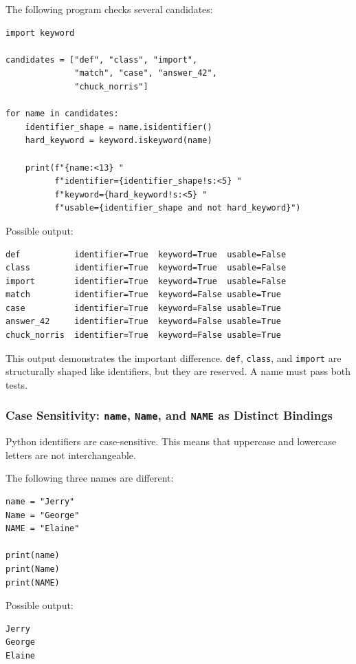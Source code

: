 The following program checks several candidates:

\begin{verbatim}
import keyword

candidates = ["def", "class", "import",
              "match", "case", "answer_42",
              "chuck_norris"]

for name in candidates:
    identifier_shape = name.isidentifier()
    hard_keyword = keyword.iskeyword(name)

    print(f"{name:<13} "
          f"identifier={identifier_shape!s:<5} "
          f"keyword={hard_keyword!s:<5} "
          f"usable={identifier_shape and not hard_keyword}")
\end{verbatim}

Possible output:

\begin{verbatim}
def           identifier=True  keyword=True  usable=False
class         identifier=True  keyword=True  usable=False
import        identifier=True  keyword=True  usable=False
match         identifier=True  keyword=False usable=True
case          identifier=True  keyword=False usable=True
answer_42     identifier=True  keyword=False usable=True
chuck_norris  identifier=True  keyword=False usable=True
\end{verbatim}

This output demonstrates the important difference. \texttt{def}, \texttt{class}, and \texttt{import} are structurally shaped like identifiers, but they are reserved. A name must pass both tests.

\subsubsection{Case Sensitivity: \texttt{name}, \texttt{Name}, and \texttt{NAME} as Distinct Bindings}

Python identifiers are case-sensitive. This means that uppercase and lowercase letters are not interchangeable.

The following three names are different:

\begin{verbatim}
name = "Jerry"
Name = "George"
NAME = "Elaine"

print(name)
print(Name)
print(NAME)
\end{verbatim}

Possible output:

\begin{verbatim}
Jerry
George
Elaine
\end{verbatim}


